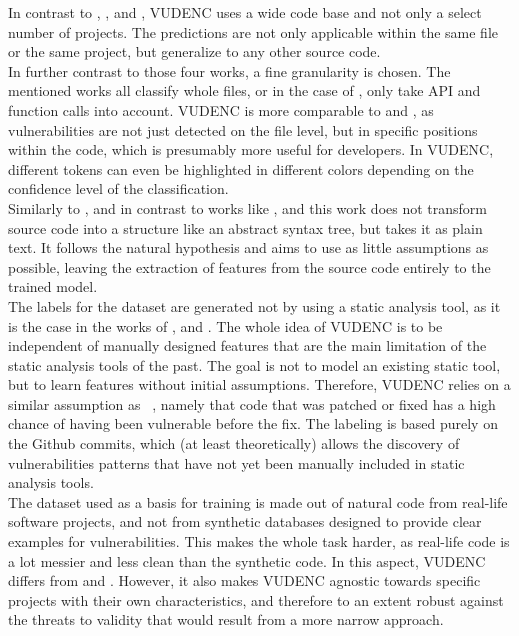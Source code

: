 \documentclass[
a4paper,
pagesize,
pdftex,
12pt,
twoside, %
BCOR=5mm, %
ngerman,
fleqn,
final,
]{scrartcl}
\begin{document}
	In contrast to \cite{Li.2018}, \cite{Pang.2015}, \cite{Hovsepyan.2012} and \cite{Dam.2017}, VUDENC uses a wide code base and not only a select number of projects. The predictions are not only applicable within the same file or the same project, but generalize to any other source code.\\
	In further contrast to those four works, a fine granularity is chosen. The mentioned works all classify whole files, or in the case of \cite{Li.2018}, only take API and function calls into account. VUDENC is more comparable to \cite{Russell.2018} and \cite{Ma.2017}, as vulnerabilities are not just detected on the file level, but in specific positions within the code, which is presumably more useful for developers. In VUDENC, different tokens can even be highlighted in different colors depending on the confidence level of the classification.\\
	Similarly to \cite{Hovsepyan.2012}, and in contrast to works like \cite{Ma.2017}, \cite{Yamaguchi.2012} and \cite{Liu.2018}
	this work does not transform source code into a structure like an abstract syntax tree, but takes it as plain text. It follows the natural hypothesis and aims to use as little assumptions as possible, leaving the extraction of features from the source code entirely to the trained model.\\
	The labels for the dataset are generated not by using a static analysis tool, as it is the case in the works of \cite{Russell.2018}, \cite{Dam.2017} and \cite{Hovsepyan.2012}. The whole idea of VUDENC is to be independent of manually designed features that are the main limitation of the static analysis tools of the past. The goal is not to model an existing static tool, but to learn features without initial assumptions. Therefore, VUDENC relies on a similar assumption as ~\cite{Liu.2018}, namely that code that was patched or fixed has a high chance of having been vulnerable before the fix. The labeling is based purely on the Github commits, which (at least theoretically) allows the discovery of vulnerabilities patterns that have not yet been manually included in static analysis tools.\\
	The dataset used as a basis for training is made out of natural code from real-life software projects, and not from synthetic databases designed to provide clear examples for vulnerabilities. This makes the whole task harder, as real-life code is a lot messier and less clean than the synthetic code. In this aspect, VUDENC differs from \cite{Russell.2018} and \cite{Li.2018}. However, it also makes VUDENC agnostic towards specific projects with their own characteristics, and therefore to an extent robust against the threats to validity that would result from a more narrow approach.\\
\end{document}
